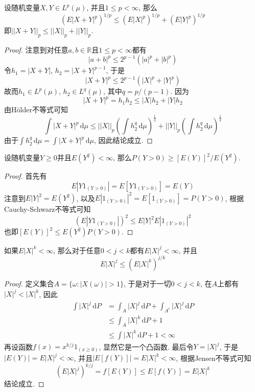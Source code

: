 \documentclass[cn, 12pt, math=mtpro2, bibstyle=apa, blue, twocol]{elegantbook}
\newcommand{\R}{\mathbb{R}}
\newcommand{\du}{\,\text{d}\mu}
\begin{document}
\begin{theorem}[Minkowski不等式]
   设随机变量$X,Y\in L^p(\mu)$, 并且$1\leq p<\infty$, 那么
   $$(E|X+Y|^p)^{1/p}\leq (E|X|^p)^{1/p}+(E|Y|^p)^{1/p}$$
   即$||X+Y||_p\leq ||X||_p+||Y||_p$.
 \end{theorem}
 \begin{proof}
   注意到对任意$a,b\in\R$且$1\leq p<\infty$都有
   $$|a+b|^p\leq2^{p-1}(|a|^p+|b|^p)$$
   令$h_1=|X+Y|$, $h_2=|X+Y|^{p-1}$, 于是
   $$|X+Y|^p\leq2^{p-1}(|X|^p+|Y|^p)$$
   故而$h_1\in L^p(\mu)$, $h_2\in L^q(\mu)$, 其中$q=p/(p-1)$. 因为
   $$|X+Y|^p=h_1h_2\leq |X|h_2+|Y|h_2$$
   由Hölder不等式可知
   $$\int|X+Y|^p\du\leq ||X||_p\left(\int h_2^q\du\right)^{\frac{1}{q}}+||Y||_p\left(\int h_2^q\du\right)^{\frac{1}{q}}$$
   由于$\int h_2^q\du=\int |X+Y|^p\du$, 因此结论成立.

 \end{proof}
 \begin{example}
 设随机变量$Y\geq0$并且$E(Y^2)<\infty$, 那么$P(Y>0)\geq [E(Y)]^2/E(Y^2)$.
 \end{example}
 \begin{proof}
   首先有
   $$E|Y1_{(Y>0)}|=E[Y1_{(Y>0)}]=E(Y)$$
   注意到$E|Y|^2=E(Y^2)$, 以及$E|1_{(Y>0)}|^2=E[1_{(Y>0)}]=P(Y>0)$, 根据Cauchy-Schwarz不等式可知
   $$(E|Y1_{(Y>0)}|)^2\leq E|Y|^2E|1_{(Y>0)}|^2$$
   也即$[E(Y)]^2\leq E(Y^2)P(Y>0)$.
 \end{proof}
 \begin{example}
 如果$E|X|^k<\infty$, 那么对于任意$0<j<k$都有$E|X|^j<\infty$, 并且
 $$E|X|^j\leq (E|X|^k)^{j/k}$$
 \end{example}
 \begin{proof}
   定义集合$A=\{\omega: |X(\omega)|>1\}$, 于是对于一切$0<j<k$, 在$A$上都有$|X|^j<|X|^k$, 因此
   \begin{align*}
   \int|X|^j\,\text{d}P&=\int_A|X|^j\,\text{d}P+\int_{A^c}|X|^j\,\text{d}P \\
   &\leq\int_A|X|^k\,\text{d}P+1 \\
   &\leq\int|X|^k\,\text{d}P+1<\infty
   \end{align*}
   再设函数$f(x)=x^{k/j}1_{(x\geq0)}$, 显然它是一个凸函数. 最后令$Y=|X|^j$, 于是$|E(Y)|=E|X|^j<\infty$, 并且$|E[f(Y)]|=E|X|^k<\infty$, 根据Jensen不等式可知
   $$(E|X|^j)^{k/j}=f[E(Y)]\leq E[f(Y)]=E|X|^k$$
   结论成立.
 \end{proof}
\end{document}
